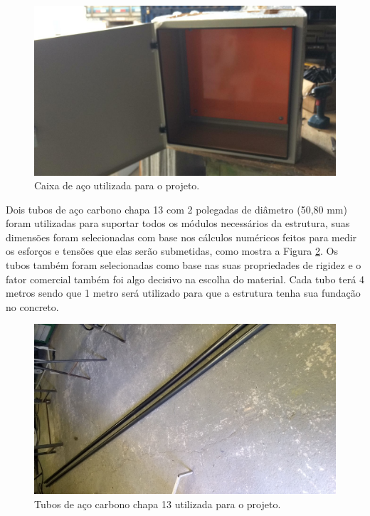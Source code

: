 \begin{figure}[H]
	\centering
    \includegraphics[keepaspectratio=true,scale=0.315]{figuras/caixa.jpg}
    \caption{Caixa de aço utilizada para o projeto.}
    \label{caixa}
\end{figure}

Dois tubos de aço carbono chapa 13 com 2 polegadas de diâmetro (50,80 mm) foram utilizadas para suportar todos os módulos necessários da estrutura, suas dimensões foram selecionadas com base nos cálculos numéricos feitos para medir os esforços e tensões que elas serão submetidas, como mostra a Figura \ref{tubos}. Os tubos também foram selecionadas como base nas suas propriedades de rigidez e o fator comercial também foi algo decisivo na escolha do material. Cada tubo terá 4 metros sendo que 1 metro será utilizado para que a estrutura tenha sua fundação no concreto.

\begin{figure}[H]
	\centering
    \includegraphics[keepaspectratio=true,scale=0.1,angle=90]{figuras/tubos.jpeg}
    \caption{Tubos de aço carbono chapa 13 utilizada para o projeto.}
    \label{tubos}
\end{figure}

